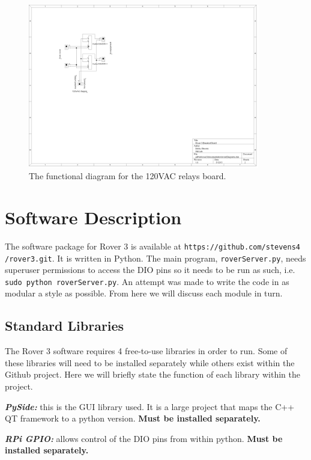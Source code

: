 \documentclass{article}
\begin{document}
\begin{figure}
\centering
\includegraphics[width=0.9\textwidth]{120VACBreakout.png}
\caption{The functional diagram for the 120VAC relays board.}
\label{fig:120VACBreakout}
\end{figure}






\section{Software Description}
\label{sect:software}
The software package for Rover 3 is available at \texttt{https://github.com/stevens4} \texttt{/rover3.git}. It is written in Python. The main program, \texttt{roverServer.py}, needs superuser permissions to access the DIO pins so it needs to be run as such, i.e. \texttt{sudo  python  roverServer.py}. An attempt was made to write the code in as modular a style as possible. From here we will discuss each module in turn.

\subsection{Standard Libraries}
The Rover 3 software requires 4 free-to-use libraries in order to run. Some of these libraries will need to be installed separately while others exist within the Github project. Here we will briefly state the function of each library within the project.

\noindent
\textbf{\emph{PySide:}} this is the GUI library used. It is a large project that maps the C++ QT framework to a python version. \textbf{Must be installed separately.}

\noindent
\textbf{\emph{RPi GPIO:}} allows control of the DIO pins from within python. \textbf{Must be installed separately.}
\end{document}

